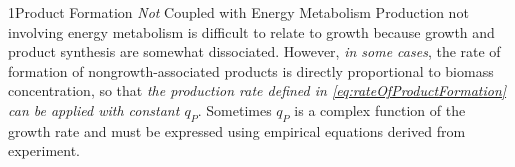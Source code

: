 \documentclass["EB-Notebook.tex"]{subfiles}
\begin{document}

\begin{sectionBox}1{Product Formation \emph{Not} Coupled with Energy Metabolism} %
  Production not involving energy metabolism is difficult to relate to growth because growth and product synthesis are somewhat dissociated. However, \emph{in some cases}, the rate of formation of nongrowth-associated products is directly proportional to biomass concentration, so that \emph{the production rate defined in \eqref{eq:rateOfProductFormation} can be applied with constant \(q_P\)}. Sometimes \(q_P\) is a complex function of the growth rate and must be expressed using empirical equations derived from experiment.
\end{sectionBox}
\end{document}
